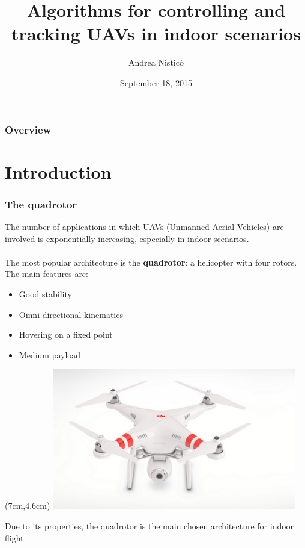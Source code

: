 \documentclass[xcolor=dvipsnames]{beamer}
\title[Algorithms for controlling and tracking UAVs in indoor scenarios]{Algorithms for controlling and tracking UAVs in indoor scenarios}
\author{Andrea Nisticò} %
\institute[UNIGE] %
{
Supervised by: Marco Baglietto, Fulvio Mastrogiovanni \\
Co-supervised by: Tommaso Falchi Delitalia \\
\medskip
DIBRIS - Department of Informatics, Bioengineering, Robotics, and Systems Engineering \\
\smallskip
University of Genova
\medskip

Degree in \textit{Robotics Engineering} 
}
\date{September 18, 2015} %
\begin{document}
\begin{frame}
\titlepage %
\end{frame}

\begin{frame}
\frametitle{Overview} 
\tableofcontents[sectionstyle=show,square]
\end{frame}


\section{Introduction} 

\begin{frame}
\frametitle{The quadrotor}
The number of applications in which UAVs (Unmanned Aerial Vehicles) are involved is exponentially increasing, especially in indoor scenarios. \\~\\ 
The most popular architecture is the \textbf{quadrotor}: a helicopter
with four rotors. The main features are:\\ 

\begin{itemize}
\item Good stability
\item Omni-directional kinematics 
\item Hovering on a fixed point
\item Medium payload
\end{itemize}

\begin{textblock*}{5cm}(7cm,4.6cm) %
\includegraphics[width=0.8\textwidth]{f/quad.png}
\end{textblock*}

\vspace{2ex}
Due to its properties, the quadrotor is the main chosen architecture for indoor flight.
\end{frame}
\end{document}
